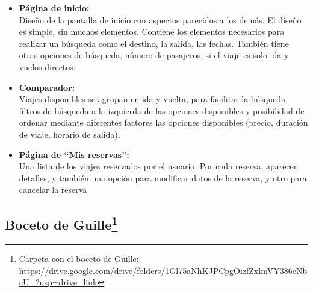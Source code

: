 \begin{itemize}
      \item\textbf{Página de inicio:} \\ Diseño de la pantalla de inicio con aspectos parecidos a los demás. El diseño es simple, sin muchos elementos. Contiene los elementos necesarios para realizar un búsqueda como el destino, la salida, las fechas. También tiene otras opciones de búsqueda, número de pasajeros, si el viaje es solo ida y vuelos directos.
      \item\textbf{Comparador:} \\ Viajes disponibles se agrupan en ida y vuelta, para facilitar la búsqueda, filtros de búsqueda a la izquierda de las opciones disponibles y posibilidad de ordenar mediante diferentes factores las opciones disponibles (precio, duración de viaje, horario de salida).
      \item\textbf{Página de ``Mis reservas'':} \\ Una lista de los viajes reservados por el usuario. Por cada reserva, aparecen detalles, y también una opción para modificar datos de la reserva, y otro para cancelar la reserva

\end{itemize}

\subsection[Boceto de Guille]{Boceto de Guille\footnote{Carpeta con el boceto de Guille: \url{https://drive.google.com/drive/folders/1Gl75aNhKJPCpgOizfZxlmVY386eNbcU_?usp=drive_link}}}

